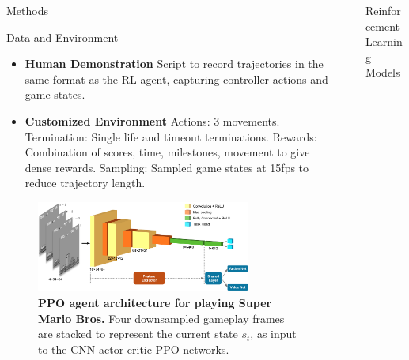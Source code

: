 \documentclass[final]{beamer}
\newlength{\sepwidth}
\newlength{\colwidth}
\newcommand{\separatorcolumn}{\begin{column}{\sepwidth}\end{column}}
\begin{document}
\begin{frame}[t]
\begin{columns}[t]
\begin{column}{\colwidth}
\begin{block}{Methods}
  
  {\large\textcolor{cardinalred}{Data and Environment}}\noindent\vspace{-1em}
  \begin{itemize}
    \item \textbf{Human Demonstration} Script to record trajectories 
    in the same format as the RL agent, capturing controller actions 
    and game states.
    \item \textbf{Customized Environment}
    \textcolor{cardinalred}{Actions}: 3 movements.
    \textcolor{cardinalred}{Termination}: Single life and timeout terminations.
    \textcolor{cardinalred}{Rewards}: Combination of scores, time, milestones, movement to give dense rewards.
    \textcolor{cardinalred}{Sampling}: Sampled game states at 15fps to
    reduce trajectory length.
  \end{itemize}

    \begin{figure}[h]%
      \centering
      \includegraphics[width=0.8\textwidth]{pics/architecture.png}
      \caption{\textbf{PPO agent architecture for playing Super Mario Bros.}
        Four downsampled gameplay frames are stacked 
        to represent the current state $s_t$, as input to the CNN actor-critic PPO
        networks.
      }%
      \label{fig:cnn}%
  \end{figure}

  \end{block}


\end{column}

\separatorcolumn

\begin{column}{\colwidth}

  \begin{minipage}{\textwidth}
      {\large\textcolor{cardinalred}{Reinforcement Learning Models}}\noindent\vspace{-0.2em}
    

\end{minipage}
\end{column}
\end{columns}
\end{frame}
\end{document}
